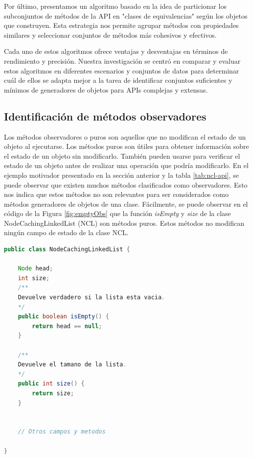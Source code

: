 Por último, presentamos un algoritmo basado en la idea de particionar los subconjuntos de métodos de la API en "clases de equivalencias" según los objetos que construyen. Esta estrategia nos permite agrupar métodos con propiedades similares y seleccionar conjuntos de métodos más cohesivos y efectivos.

Cada uno de estos algoritmos ofrece ventajas y desventajas en términos de rendimiento y precisión. Nuestra investigación se centró en comparar y evaluar estos algoritmos en diferentes escenarios y conjuntos de datos para determinar cuál de ellos se adapta mejor a la tarea de identificar conjuntos suficientes y mínimos de generadores de objetos para APIs complejas y extensas.


\subsection{Identificación de métodos observadores}

Los métodos observadores o puros son aquellos que no modifican el estado de un objeto al ejecutarse. Los métodos puros son útiles para obtener información sobre el estado de un objeto sin modificarlo. También pueden usarse para verificar el estado de un objeto antes de realizar una operación que podría modificarlo. En el ejemplo motivador presentado en la sección anterior y la tabla \ref{tab:ncl-api}, se puede observar que existen muchos métodos clasificados como observadores. Esto nos indica que estos métodos no son relevantes para ser considerados como métodos generadores de objetos de una clase. 
Fácilmente, se puede observar en el código de la Figura \ref{fig:emptyObs} que la función \emph{isEmpty} y \emph{size} de la clase NodeCachingLinkedList (NCL) son métodos puros.  Estos  métodos no modifican ningún campo de estado de la clase NCL.
\begin{lstlisting}[language=Java, label=fig:emptyObs, caption=Métodos observadores de la clase NCL. Se observa que no modifican el estado de NCL., captionpos=b, frame=tb, float=t]
public class NodeCachingLinkedList {

    Node head;
    int size;
    /**
    Devuelve verdadero si la lista esta vacia. 
    */ 
    public boolean isEmpty() { 
        return head == null; 
    }
    
    /**
    Devuelve el tamano de la lista. 
    */ 
    public int size() { 
        return size; 
    }
    
    
    // Otros campos y metodos
    
}
\end{lstlisting}


